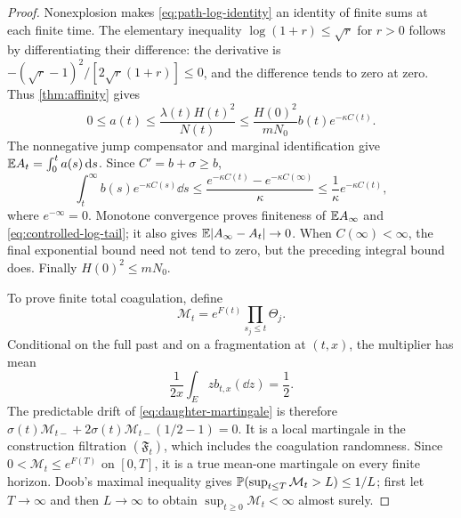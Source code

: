 \begin{proof}
Nonexplosion makes \eqref{eq:path-log-identity} an identity of finite
sums at each finite time. The elementary inequality
$\log(1+r)\leq\sqrt r$ for $r>0$ follows by differentiating their
difference: the derivative is
$-(\sqrt r-1)^2/[2\sqrt r(1+r)]\leq0$, and the difference tends
to zero at zero. Thus \cref{thm:affinity} gives
\begin{equation}
 0\leq a(t)\leq\frac{\lambda(t)H(t)^2}{N(t)}
 \leq\frac{H(0)^2}{mN_0}b(t)e^{-\kappa C(t)}.
 \label{eq:log-rate-bound}
\end{equation}
The nonnegative jump compensator and marginal identification give
$\mathbb E A_t=\int_0^t a(s)\,\mathrm d s$. Since $C'=b+\sigma\geq b$,
\[
 \int_t^\infty b(s)e^{-\kappa C(s)}\dd s
 \leq\frac{e^{-\kappa C(t)}-e^{-\kappa C(\infty)}}{\kappa}
 \leq\frac1\kappa e^{-\kappa C(t)},
\]
where $e^{-\infty}=0$. Monotone convergence proves finiteness of
$\mathbb E A_\infty$ and \eqref{eq:controlled-log-tail}; it also gives
$\mathbb E|A_\infty-A_t|\to0$. When $C(\infty)<\infty$, the final
exponential bound need not tend to zero, but the preceding integral
bound does. Finally $H(0)^2\leq mN_0$.

To prove finite total coagulation, define
\begin{equation}
 \mathcal M_t=e^{F(t)}\prod_{s_j\leq t}\Theta_j.
 \label{eq:daughter-martingale}
\end{equation}
Conditional on the full past and on a fragmentation at $(t,x)$,
the multiplier has mean
\[
 \frac1{2x}\int_E z b_{t,x}(\dd z)=\frac12.
\]
The predictable drift of \eqref{eq:daughter-martingale} is therefore
$\sigma(t)\mathcal M_{t-}+2\sigma(t)\mathcal M_{t-}(1/2-1)=0$.
It is a local martingale in the construction filtration
$(\mathfrak F_t)$, which includes the coagulation randomness. Since
$0<\mathcal M_t\leq e^{F(T)}$ on $[0,T]$, it is a true mean-one
martingale on every finite horizon. Doob's maximal inequality gives
$\mathbb P(\sup_{t\leq T}\mathcal M_t>L)\leq1/L$; first let
$T\to\infty$ and then $L\to\infty$ to obtain
$\sup_{t\geq0}\mathcal M_t<\infty$ almost surely.


\end{proof}
